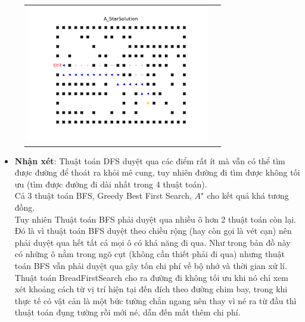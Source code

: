 \documentclass[11pt]{scrartcl} %
\begin{document}
\begin{itemize}
\begin{figure}[h]
\begin{tabular}{cc}
				\includegraphics[width=8cm]{Figures/fg1_astar.png}
			\end{tabular}
		\end{figure}
		\begin{itemize}
			\item \textbf{Nhận xét}: Thuật toán DFS duyệt qua các điểm rất ít mà vẫn có thể tìm được đường để thoát ra khỏi mê cung, tuy nhiên đường đi tìm được không tối ưu (tìm được đường đi dài nhất trong 4 thuật toán).\\ Cả 3 thuật toán BFS, Greedy Best First Search, $A^{\star}$ cho kết quả khá tương đồng. \\Tuy nhiên Thuật toán BFS phải duyệt qua nhiều ô hơn 2 thuật toán còn lại. Đó là vì thuật toán BFS duyệt theo chiều rộng (hay còn gọi là vét cạn) nên phải duyệt qua hết tất cả mọi ô có khả năng đi qua. Như trong bản đồ này có những ô nằm trong ngõ cụt (không cần thiết phải đi qua) nhưng thuật toán BFS vẫn phải duyệt qua gây tốn chi phí về bộ nhớ và thời gian xử lí.\\Thuật toán BreadFirstSearch cho ra đường đi không tối ưu khi nó chỉ xem xét khoảng cách từ vị trí hiện tại đến đích theo đường chim bay, trong khi thực tế có vật cản là một bức tường chắn ngang nên thay vì né ra từ đầu thì thuật toán đụng tường rồi mới né, dẫn đến mất thêm chi phí.
		\end{itemize}
	

\end{itemize}
\end{document}
